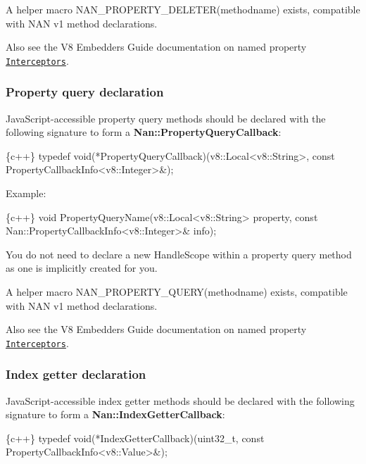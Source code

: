 A helper macro {\ttfamily N\+A\+N\+\_\+\+P\+R\+O\+P\+E\+R\+T\+Y\+\_\+\+D\+E\+L\+E\+T\+E\+R(methodname)} exists, compatible with N\+AN v1 method declarations.

Also see the V8 Embedders Guide documentation on named property \href{https://developers.google.com/v8/embed#interceptors}{\tt Interceptors}.

\label{_api_nan_property_query}%
 \subsubsection*{Property query declaration}

Java\+Script-\/accessible property query methods should be declared with the following signature to form a {\bfseries {\ttfamily Nan\+::\+Property\+Query\+Callback}}\+:


\begin{DoxyCode}
\{c++\}
typedef void(*PropertyQueryCallback)(v8::Local<v8::String>,
                                     const PropertyCallbackInfo<v8::Integer>&);
\end{DoxyCode}


Example\+:


\begin{DoxyCode}
\{c++\}
void PropertyQueryName(v8::Local<v8::String> property,
                       const Nan::PropertyCallbackInfo<v8::Integer>& info);
\end{DoxyCode}


You do not need to declare a new {\ttfamily Handle\+Scope} within a property query method as one is implicitly created for you.

A helper macro {\ttfamily N\+A\+N\+\_\+\+P\+R\+O\+P\+E\+R\+T\+Y\+\_\+\+Q\+U\+E\+R\+Y(methodname)} exists, compatible with N\+AN v1 method declarations.

Also see the V8 Embedders Guide documentation on named property \href{https://developers.google.com/v8/embed#interceptors}{\tt Interceptors}.

\label{_api_nan_index_getter}%
 \subsubsection*{Index getter declaration}

Java\+Script-\/accessible index getter methods should be declared with the following signature to form a {\bfseries {\ttfamily Nan\+::\+Index\+Getter\+Callback}}\+:


\begin{DoxyCode}
\{c++\}
typedef void(*IndexGetterCallback)(uint32\_t,
                                   const PropertyCallbackInfo<v8::Value>&);
\end{DoxyCode}


